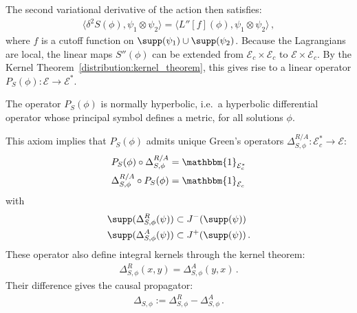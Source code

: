     The second variational derivative of the action then satisfies:
    \begin{gather}
        \bigl\langle\delta^2S(\phi),\psi_1\otimes\psi_2\bigr\rangle = \bigl\langle L''[f](\phi),\psi_1\otimes\psi_2\bigr\rangle\,,
    \end{gather}
    where $f$ is a cutoff function on $\supp(\psi_1)\cup\supp(\psi_2)$. Because the Lagrangians are local, the linear maps $S''(\phi)$ can be extended from $\mathcal{E}_c\times\mathcal{E}_c$ to $\mathcal{E}\times\mathcal{E}_c$. By the Kernel Theorem~\ref{distribution:kernel_theorem}, this gives rise to a linear operator $P_S(\phi):\mathcal{E}\rightarrow\mathcal{E}^*$.

    \begin{axiom}
        The operator $P_S(\phi)$ is normally hyperbolic, i.e.~a hyperbolic differential operator whose principal symbol defines a metric, for all solutions $\phi$.
    \end{axiom}

    This axiom implies that $P_S(\phi)$ admits unique Green's operators $\Delta^{R/A}_{S,\phi}:\mathcal{E}^*_c\rightarrow\mathcal{E}$:
    \begin{gather}
        \begin{aligned}
            P_S(\phi)\circ\Delta^{R/A}_{S,\phi} &= \mathbbm{1}_{\mathcal{E}^*_c}\\
            \Delta^{R/A}_{S,\phi}\circ P_S(\phi) &= \mathbbm{1}_{\mathcal{E}_c}
        \end{aligned}
    \end{gather}
    with
    \begin{gather}
        \begin{aligned}
            \supp(\Delta^R_{S,\phi}(\psi)) &\subset J^-(\supp(\psi))\\
            \supp(\Delta^A_{S,\phi}(\psi)) &\subset J^+(\supp(\psi))\,.
        \end{aligned}
    \end{gather}
    These operator also define integral kernels through the kernel theorem:
    \begin{gather}
        \Delta^R_{S,\phi}(x,y) = \Delta^A_{S,\phi}(y,x)\,.
    \end{gather}
    Their difference gives the causal propagator:
    \begin{gather}
        \Delta_{S,\phi} := \Delta^R_{S,\phi} - \Delta^A_{S,\phi}\,.
    \end{gather}

